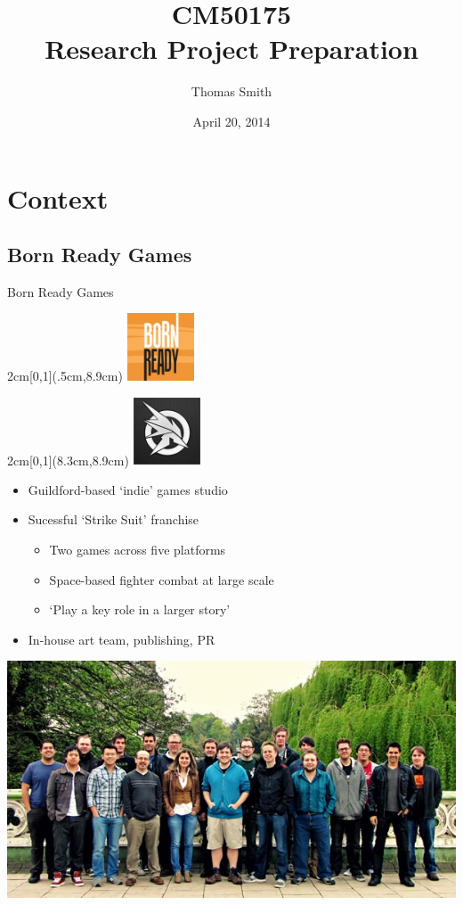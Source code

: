 \documentclass[t]{beamer}
\author[T.A.E.Smith]{Thomas Smith}
\title[CM50175]{CM50175\\Research Project Preparation}
\institute[Bath/CS]{Centre for Digital Entertainment\\University of Bath}
\date{April 20, 2014}
\begin{document}

\begin{frame}
	\titlepage
\end{frame}

\section{Context}
	\subsection{Born Ready Games}
		\begin{frame}{Born Ready Games}
			\begin{textblock*}{2cm}[0,1](.5cm,8.9cm) %
			\includegraphics[width=2cm]{bornready.jpg}
			\end{textblock*}
			\begin{textblock*}{2cm}[0,1](8.3cm,8.9cm) %
			\includegraphics[width=2cm]{strikesuitzero.jpg}
			\end{textblock*}
			\begin{itemize}
				\item Guildford-based `indie' games studio
				\item Sucessful `Strike Suit' franchise
				\begin{itemize}
					\item Two games across five platforms
					\item Space-based fighter combat at large scale
					\item `Play a key role in a larger story'
				\end{itemize}
				\item In-house art team, publishing, PR
			\end{itemize}
			\begin{center}
				\includegraphics[width=0.5\linewidth]{team.jpg}
			\end{center}
		\end{frame}
\end{document}

